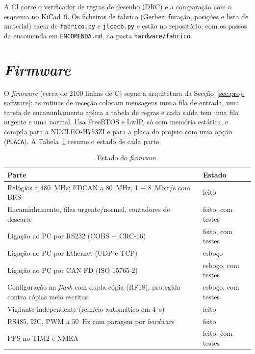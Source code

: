 A CI corre o verificador de regras de desenho (DRC) e a comparação com o
esquema no KiCad~9. Os ficheiros de fabrico (Gerber, furação, posições e
lista de material) saem de \texttt{fabrico.py} e \texttt{jlcpcb.py} e estão no
repositório, com os passos da encomenda em \texttt{ENCOMENDA.md}, na pasta
\texttt{hardware/fabrico}.

\section{\textit{Firmware}}
\label{sec:impl-firmware}

O \textit{firmware} (cerca de 2100 linhas de C) segue a arquitetura da
Secção~\ref{sec:proj-software}: as rotinas de receção colocam mensagens numa
fila de entrada, uma tarefa de encaminhamento aplica a tabela de regras e
cada saída tem uma fila urgente e uma normal. Usa FreeRTOS e LwIP, só com
memória estática, e compila para a NUCLEO-H753ZI e para a placa do projeto
com uma opção (\texttt{PLACA}). A Tabela~\ref{tab:impl-firmware} resume o
estado de cada parte.

\begin{table}[htbp]
\centering\small{}
\renewcommand{\arraystretch}{1.15}
\caption{Estado do \textit{firmware}.}
\label{tab:impl-firmware}
\begin{tabularx}{\textwidth}{@{}>{\raggedright\arraybackslash}X>{\raggedright\arraybackslash}p{}@{}}
\toprule
\rowcolor{LasetTint}
Parte & Estado \\
\midrule
Relógios a 480~MHz; FDCAN a 80~MHz, 1 + 8~Mbit/s com BRS & feito \\
Encaminhamento, filas urgente/normal, contadores de descarte & feito, com testes \\
Ligação ao PC por RS232 (COBS + CRC-16) & feito, com testes \\
Ligação ao PC por Ethernet (UDP e TCP) & esboço \\
Ligação ao PC por CAN FD (ISO 15765-2) & esboço, com testes \\
Configuração na \textit{flash} com dupla cópia (RF18), protegida contra cópias meio escritas & esboço, com testes \\
Vigilante independente (reinício automático em 4~s) & feito \\
RS485, I2C, PWM a 50~Hz com paragem por \textit{hardware} & feito \\
PPS no TIM2 e NMEA & feito, com testes \\
\bottomrule
\end{tabularx}
\end{table}

